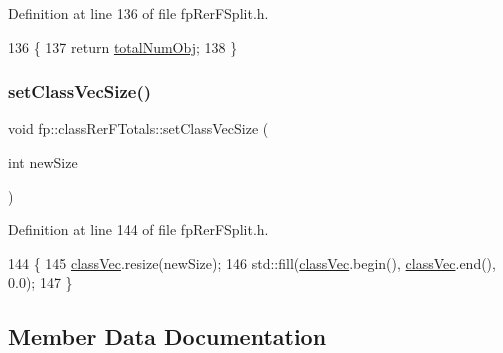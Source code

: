 Definition at line 136 of file fp\+Rer\+F\+Split.\+h.


\begin{DoxyCode}
136                                 \{
137                 \textcolor{keywordflow}{return} \hyperlink{classfp_1_1classRerFTotals_a0963284a03586b3a25c284bdb35f9e44}{totalNumObj};
138             \}
\end{DoxyCode}
\mbox{\label{classfp_1_1classRerFTotals_a51bf817a7dafd4dab98d9cfe3841a41d}} 
\subsubsection{\texorpdfstring{set\+Class\+Vec\+Size()}{setClassVecSize()}}
{\footnotesize\ttfamily void fp\+::class\+Rer\+F\+Totals\+::set\+Class\+Vec\+Size (\begin{DoxyParamCaption}\item[{int}]{new\+Size }\end{DoxyParamCaption})\hspace{0.3cm}{\ttfamily [inline]}}



Definition at line 144 of file fp\+Rer\+F\+Split.\+h.


\begin{DoxyCode}
144                                                     \{
145                 \hyperlink{classfp_1_1classRerFTotals_a4a7b583fc52d7631771f5dd04d20a68a}{classVec}.resize(newSize);
146                 std::fill(\hyperlink{classfp_1_1classRerFTotals_a4a7b583fc52d7631771f5dd04d20a68a}{classVec}.begin(), \hyperlink{classfp_1_1classRerFTotals_a4a7b583fc52d7631771f5dd04d20a68a}{classVec}.end(), 0.0);
147             \}
\end{DoxyCode}


\subsection{Member Data Documentation}
\mbox{\label{classfp_1_1classRerFTotals_a4a7b583fc52d7631771f5dd04d20a68a}} 
